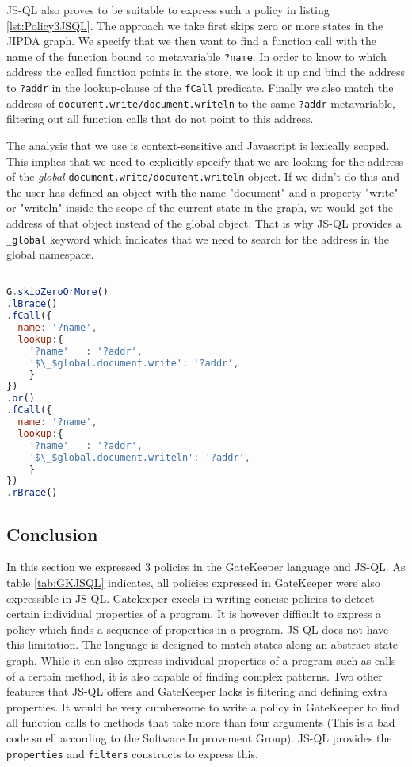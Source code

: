 JS-QL also proves to be suitable to express such a policy in listing \ref{lst:Policy3JSQL}. The approach we take first skips zero or more states in the JIPDA graph. We specify that we then want to find a function call with the name of the function bound to metavariable \texttt{?name}. In order to know to which address the called function points in the store, we look it up and bind the address to \texttt{?addr} in the lookup-clause of the \texttt{fCall} predicate. Finally we also match the address of \texttt{document.write/document.writeln} to the same \texttt{?addr} metavariable, filtering out all function calls that do not point to this address.

The analysis that we use is context-sensitive and Javascript is lexically scoped. This implies that we need to explicitly specify that we are looking for the address of the \textit{global} \texttt{document.write/document.writeln} object. If we didn't do this and the user has defined an object with the name "document" and a property "write" or "writeln" inside the scope of the current state in the graph, we would get the address of that object instead of the global object. That is why JS-QL provides a \texttt{\_global} keyword which indicates that we need to search for the address in the global namespace. 

\begin{lstlisting}[label={lst:Policy3JSQL},language=JavaScript,caption=Policy 3 in JS-QL,mathescape=true]  % float=t?

G.skipZeroOrMore()
.lBrace()
.fCall({
  name: '?name',
  lookup:{
    '?name'   : '?addr',
    '$\_$global.document.write': '?addr',
    }
})
.or()
.fCall({
  name: '?name',
  lookup:{
    '?name'   : '?addr',
    '$\_$global.document.writeln': '?addr',
    }
})
.rBrace()
\end{lstlisting}


\subsection{Conclusion}
 In this section we expressed 3 policies in the GateKeeper language and JS-QL. As table \ref{tab:GKJSQL} indicates, all policies expressed in GateKeeper were also expressible in JS-QL. Gatekeeper excels in writing concise policies to detect certain individual properties of a program. It is however difficult to express a policy which finds a sequence of properties in a program. JS-QL does not have this limitation. The language is designed to match states along an abstract state graph. While it can also express individual properties of a program such as calls of a certain method, it is also capable of finding complex patterns. Two other features that JS-QL offers and GateKeeper lacks is filtering and defining extra properties. It would be very cumbersome to write a policy in GateKeeper to find all function calls to methods that take more than four arguments (This is a bad code smell according to the Software Improvement Group\cite{MaintainableSoftware}). JS-QL provides the \texttt{properties} and \texttt{filters} constructs to express this.

